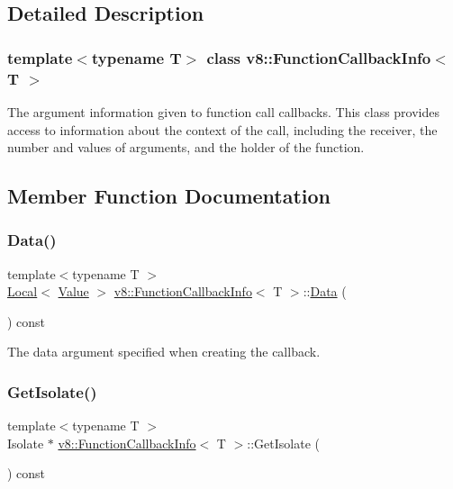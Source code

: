 \subsection{Detailed Description}
\subsubsection*{template$<$typename T$>$\newline
class v8\+::\+Function\+Callback\+Info$<$ T $>$}

The argument information given to function call callbacks. This class provides access to information about the context of the call, including the receiver, the number and values of arguments, and the holder of the function. 

\subsection{Member Function Documentation}
\mbox{\label{classv8_1_1FunctionCallbackInfo_ab0ebfc2ea43af2fdfc3d085272bf499f}} 
\subsubsection{\texorpdfstring{Data()}{Data()}}
{\footnotesize\ttfamily template$<$typename T $>$ \\
\mbox{\hyperlink{classv8_1_1Local}{Local}}$<$ \mbox{\hyperlink{classv8_1_1Value}{Value}} $>$ \mbox{\hyperlink{classv8_1_1FunctionCallbackInfo}{v8\+::\+Function\+Callback\+Info}}$<$ T $>$\+::\mbox{\hyperlink{classv8_1_1Data}{Data}} (\begin{DoxyParamCaption}{ }\end{DoxyParamCaption}) const}

The data argument specified when creating the callback. \mbox{\label{classv8_1_1FunctionCallbackInfo_a7eee713a6f95d5707ce788861754682f}} 
\subsubsection{\texorpdfstring{Get\+Isolate()}{GetIsolate()}}
{\footnotesize\ttfamily template$<$typename T $>$ \\
Isolate $\ast$ \mbox{\hyperlink{classv8_1_1FunctionCallbackInfo}{v8\+::\+Function\+Callback\+Info}}$<$ T $>$\+::Get\+Isolate (\begin{DoxyParamCaption}{ }\end{DoxyParamCaption}) const}

